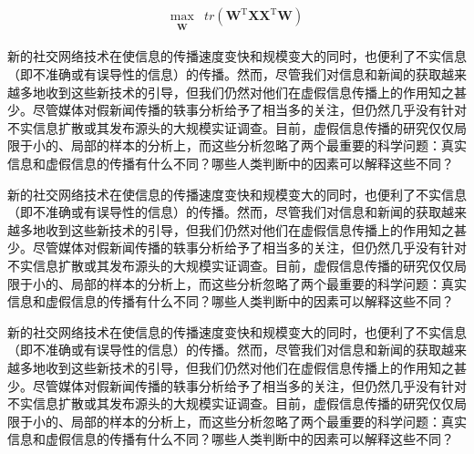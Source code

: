 \documentclass[a4paper,AutoFakeBold,oneside,12pt]{book}
\begin{document}
\begin{nopagenumber}
	\begin{equation}
		\label{PCA_goal_appx2}
		\begin{aligned}
			\max_{\substack{\bm{W}}} & tr(\bm{W}^\mathrm{T}\bm{X}\bm{X}^ \mathrm{T}\bm{W})
		\end{aligned}
	\end{equation}

	新的社交网络技术在使信息的传播速度变快和规模变大的同时，也便利了不实信息（即不准确或有误导性的信息）的传播。然而，尽管我们对信息和新闻的获取越来越多地收到这些新技术的引导，但我们仍然对他们在虚假信息传播上的作用知之甚少。尽管媒体对假新闻传播的轶事分析给予了相当多的关注，但仍然几乎没有针对不实信息扩散或其发布源头的大规模实证调查。目前，虚假信息传播的研究仅仅局限于小的、局部的样本的分析上，而这些分析忽略了两个最重要的科学问题：真实信息和虚假信息的传播有什么不同？哪些人类判断中的因素可以解释这些不同？

	新的社交网络技术在使信息的传播速度变快和规模变大的同时，也便利了不实信息（即不准确或有误导性的信息）的传播。然而，尽管我们对信息和新闻的获取越来越多地收到这些新技术的引导，但我们仍然对他们在虚假信息传播上的作用知之甚少。尽管媒体对假新闻传播的轶事分析给予了相当多的关注，但仍然几乎没有针对不实信息扩散或其发布源头的大规模实证调查。目前，虚假信息传播的研究仅仅局限于小的、局部的样本的分析上，而这些分析忽略了两个最重要的科学问题：真实信息和虚假信息的传播有什么不同？哪些人类判断中的因素可以解释这些不同？

	新的社交网络技术在使信息的传播速度变快和规模变大的同时，也便利了不实信息（即不准确或有误导性的信息）的传播。然而，尽管我们对信息和新闻的获取越来越多地收到这些新技术的引导，但我们仍然对他们在虚假信息传播上的作用知之甚少。尽管媒体对假新闻传播的轶事分析给予了相当多的关注，但仍然几乎没有针对不实信息扩散或其发布源头的大规模实证调查。目前，虚假信息传播的研究仅仅局限于小的、局部的样本的分析上，而这些分析忽略了两个最重要的科学问题：真实信息和虚假信息的传播有什么不同？哪些人类判断中的因素可以解释这些不同？

	\endgroup
\end{nopagenumber}

\blankmatter



\blankmatter

\end{document}
